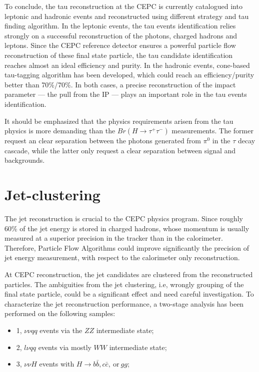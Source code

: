 To conclude, the tau reconstruction at the CEPC is currently catalogued into leptonic and hadronic events
and reconstructed using different strategy and tau finding algorithm.
In the leptonic events, the tau events identification relies strongly on a successful reconstruction of the photons,
charged hadrons and leptons.
Since the CEPC reference detector ensures a powerful particle flow reconstruction of these final state particle,
the tau candidate identification reaches almost an ideal efficiency and purity.
In the hadronic events, cone-based tau-tagging algorithm has been developed,
which could reach an efficiency/purity better than 70\%/70\%.
In both cases, a precise reconstruction of the impact parameter --- the pull from the IP ---
plays an important role in the tau events identification.  

It should be emphasized that the physics requirements arisen from the tau physics is more demanding
than the $Br(H\to\tau^+\tau^-)$ measurements.
The former request an clear separation between the photons generated from $\pi^0$ in the $\tau$ decay cascade,
while the latter only request a clear separation between signal and backgrounds. 



\section{Jet-clustering\label{sec:jet-clustering}}
The jet reconstruction is crucial to the CEPC physics program.
Since roughly 60\% of the jet energy is stored in charged hadrons,
whose momentum is usually measured at a superior precision in the tracker than in the calorimeter.
Therefore, Particle Flow Algorithms could improve significantly the precision of jet energy measurement,
with respect to the calorimeter only reconstruction. 

At CEPC reconstruction, the jet candidates are clustered from the reconstructed particles.
The ambiguities from the jet clustering, i.e, wrongly grouping of the final state particle,
could be a significant effect and need careful investigation. To characterize the jet reconstruction performance,
a two-stage analysis has been performed on the following samples: 

\begin{itemize}
\item [] 1, $\nu\nu qq$ events via the $ZZ$ intermediate state;

\item [] 2, $l\nu qq$ events via mostly $WW$ intermediate state;

\item [] 3, $\nu\nu H$ events with $H \to b\bar{b}, c\bar{c},~\mbox{or}~gg$;
\end{itemize}

